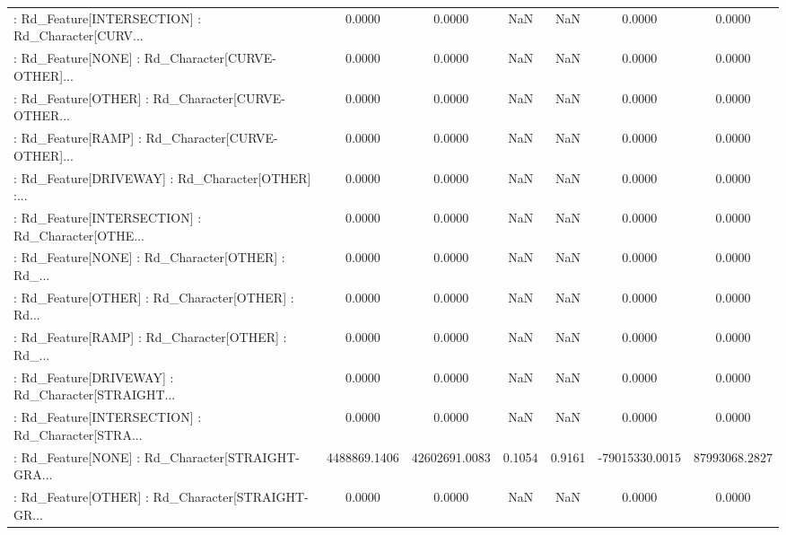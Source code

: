 \begin{longtable}{p{4cm}cccccc}
 : Rd\_Feature[INTERSECTION] : Rd\_Character[CURV... &            0.0000 &            0.0000 &     NaN &          NaN &             0.0000 &            0.0000 \\
 : Rd\_Feature[NONE] : Rd\_Character[CURVE-OTHER]... &            0.0000 &            0.0000 &     NaN &          NaN &             0.0000 &            0.0000 \\
 : Rd\_Feature[OTHER] : Rd\_Character[CURVE-OTHER... &            0.0000 &            0.0000 &     NaN &          NaN &             0.0000 &            0.0000 \\
 : Rd\_Feature[RAMP] : Rd\_Character[CURVE-OTHER]... &            0.0000 &            0.0000 &     NaN &          NaN &             0.0000 &            0.0000 \\
 : Rd\_Feature[DRIVEWAY] : Rd\_Character[OTHER] :... &            0.0000 &            0.0000 &     NaN &          NaN &             0.0000 &            0.0000 \\
 : Rd\_Feature[INTERSECTION] : Rd\_Character[OTHE... &            0.0000 &            0.0000 &     NaN &          NaN &             0.0000 &            0.0000 \\
 : Rd\_Feature[NONE] : Rd\_Character[OTHER] : Rd\_... &            0.0000 &            0.0000 &     NaN &          NaN &             0.0000 &            0.0000 \\
 : Rd\_Feature[OTHER] : Rd\_Character[OTHER] : Rd... &            0.0000 &            0.0000 &     NaN &          NaN &             0.0000 &            0.0000 \\
 : Rd\_Feature[RAMP] : Rd\_Character[OTHER] : Rd\_... &            0.0000 &            0.0000 &     NaN &          NaN &             0.0000 &            0.0000 \\
 : Rd\_Feature[DRIVEWAY] : Rd\_Character[STRAIGHT... &            0.0000 &            0.0000 &     NaN &          NaN &             0.0000 &            0.0000 \\
 : Rd\_Feature[INTERSECTION] : Rd\_Character[STRA... &            0.0000 &            0.0000 &     NaN &          NaN &             0.0000 &            0.0000 \\
 : Rd\_Feature[NONE] : Rd\_Character[STRAIGHT-GRA... &      4488869.1406 &     42602691.0083 &  0.1054 &       0.9161 &     -79015330.0015 &     87993068.2827 \\
 : Rd\_Feature[OTHER] : Rd\_Character[STRAIGHT-GR... &            0.0000 &            0.0000 &     NaN &          NaN &             0.0000 &            0.0000 \\

\end{longtable}
